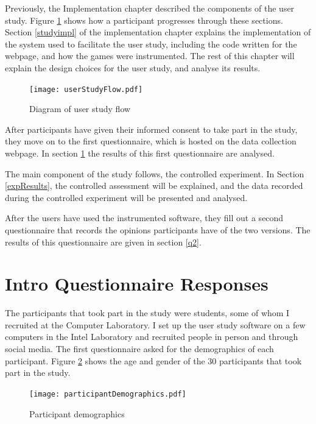 \documentclass[12pt,a4paper,twoside,openright]{report}
\begin{document}
Previously, the Implementation chapter described the components of the user study. Figure \ref{flow2} shows how a participant progresses through these sections.
Section \ref{studyimpl} of the implementation chapter explains the implementation of the system used to facilitate the user study, including the code written for the webpage, and how the games were instrumented.
The rest of this chapter will explain the design choices for the user study, and analyse its results.

\begin{figure}[tbh]
\centerline{\texttt{[image: userStudyFlow.pdf]}}
\caption{Diagram of user study flow}
\label{flow2}
\end{figure}

After participants have given their informed consent to take part in the study, they move on to the first questionnaire, which is hosted on the data collection webpage. 
In section \ref{q1} the results of this first questionnaire are analysed.

The main component of the study follows, the controlled experiment.
In Section \ref{expResults}, the controlled assessment will be explained, and the data recorded during the controlled experiment will be presented and analysed.

After the users have used the instrumented software, they fill out a second questionnaire that records the opinions participants have of the two versions. The results of this questionnaire are given in section \ref{q2}.


\section{Intro Questionnaire Responses}
\label{q1}

The participants that took part in the study were students, some of whom I recruited at the Computer Laboratory. I set up the user study software on a few computers in the Intel Laboratory and recruited people in person and through social media.
The first questionnaire asked for the demographics of each participant.
Figure \ref{demographics} shows the age and gender of the 30 participants that took part in the study.

\begin{figure}[tbh]
\centerline{\texttt{[image: participantDemographics.pdf]}}
\caption{Participant demographics}
\label{demographics}
\end{figure}
\end{document}
